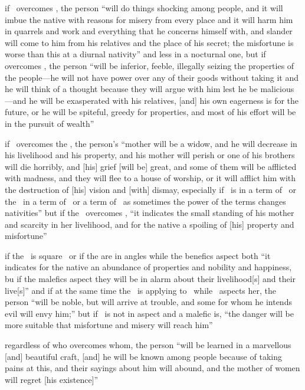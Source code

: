 \begin{description}[style=multiline,leftmargin=1.5cm]
\item[\Mars\Square\Mercury] if \Mars\, overcomes \Mercury, the person ``will do things shocking among people, and it will imbue the native with reasons for misery from every place and it will harm him in quarrels and work and everything that he concerns himself with, and slander will come to him from his relatives and the place of his secret; the misfortune is worse than this at a diurnal nativity'' and less in a nocturnal one, but if \Mercury\, overcomes \Mars, the person ``will be inferior, feeble, illegally seizing the properties of the people---he will not have power over any of their goods without taking it and he will think of a thought because they will argue with him lest he be malicious---and he will be exasperated with his relatives, [and] his own eagerness is for the future, or he will be spiteful, greedy for properties, and most of his effort will be in the pursuit of wealth''

\item[\Mars\Square\Moon] if \Mars\, overcomes the \Moon, the person's ``mother will be a widow, and he will decrease in his livelihood and his property, and his mother will perish or one of his brothers will die horribly, and [his] grief [will be] great, and some of them will be afflicted with madness, and they will flee to a house of worship, or it will afflict him with the destruction of [his] vision and [with] dismay, especially if \Mars\, is in a term of \Saturn\, or the \Moon\, in a term of \Mercury\, or a term of \Mars\, as sometimes the power of the terms changes nativities'' but if the \Moon\, overcomes \Mars, ``it indicates the small standing of his mother and scarcity in her livelihood, and for the native a spoiling of [his] property and misfortune''

\item[\Sun\Square\Moon] if the \Sun\, is square \Moon\, or if the are in angles while the benefics aspect both ``it indicates for the native an abundance of properties and nobility and happiness, bu if the malefics aspect they will be in alarm about their livelihood[s] and their live[s]'' and if at the same time the \Moon\, is applying to \Jupiter\, while \Jupiter\, aspects her, the person ``will be noble, but will arrive at trouble, and some for whom he intends evil will envy him;'' but if \Jupiter\, is not in aspect and a malefic is, ``the danger will be more suitable that misfortune and misery will reach him''

\item[\Mercury\Square\Venus] regardless of who overcomes whom, the person ``will be learned in a marvellous [and] beautiful craft, [and] he will be known among people because of taking pains at this, and their sayings about him will abound, and the mother of women will regret [his existence]''


\end{description}
